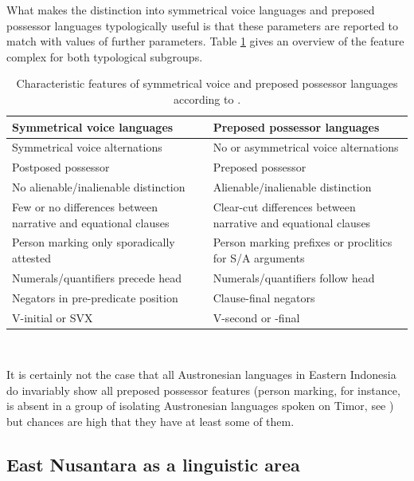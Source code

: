 What makes the distinction into symmetrical voice languages and preposed possessor languages typologically useful is that these parameters are reported to match with values of further parameters. Table \ref{table:sympre} gives an overview of the feature complex for both typological subgroups. 

\begin{table}[ht]
\begin{center}
\begin{footnotesize}
\begin{tabular}{p{6cm} p{6cm}}
\hline\hline
Symmetrical voice languages & Preposed possessor languages \tabularnewline
\hline
Symmetrical voice alternations & No or asymmetrical voice alternations \tabularnewline
Postposed possessor & Preposed possessor \tabularnewline
No alienable/inalienable distinction & Alienable/inalienable distinction \tabularnewline
Few or no differences between narrative and equational clauses & Clear-cut differences between narrative and equational clauses \tabularnewline
Person marking only sporadically attested & Person marking prefixes or proclitics for S/A arguments \tabularnewline
Numerals/quantifiers precede head & Numerals/quantifiers follow head \tabularnewline
Negators in pre-predicate position & Clause-final negators \tabularnewline
V-initial or SVX & V-second or -final \tabularnewline
\hline
\end{tabular}
\caption[Characteristic features of symmetrical voice and preposed possessor languages]{Characteristic features of symmetrical voice and preposed possessor languages according to \citet[175]{Himmelmann2005austronesian}.}
\label{table:sympre}
\end{footnotesize}
\end{center}
\end{table}
\

It is certainly not the case that all Austronesian languages in Eastern Indonesia do invariably show all preposed possessor features (person marking, for instance, is absent in a group of isolating Austronesian languages spoken on Timor, see \citealt[175]{Himmelmann2005austronesian}) but chances are high that they have at least some of them. 

\subsection{East Nusantara as a linguistic area}\label{sec:nusantara}

